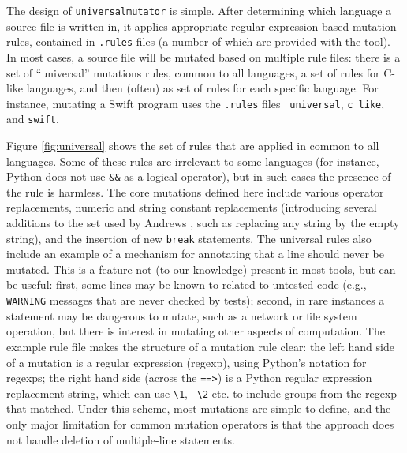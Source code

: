 The design of {\tt universalmutator} is simple.  After determining
which language a source file is written in, it applies appropriate
regular expression based mutation rules, contained in {\tt .rules}
files (a number of which are provided with the tool).  In most cases, a source file will be mutated based on multiple
rule files:  there is a set of ``universal'' mutations rules, common
to all languages, a set of rules for C-like languages, and then
(often) as set of rules for each specific language.  For instance,
mutating a Swift program uses the {\tt .rules} files {\tt
  universal}, {\tt c\_like}, and {\tt swift}.  

Figure \ref{fig:universal} shows the set of rules that are applied in
common to all languages.  Some of these rules are irrelevant to some
languages (for instance, Python does not use {\tt \&\&} as a logical
operator), but in such cases the presence of the rule is harmless.  The
core mutations defined here include various operator replacements,
numeric and string constant replacements (introducing several
additions to the set used by Andrews \cite{mutant}, such as replacing
any string by the empty string), and the insertion of new {\tt break}
statements.  The universal rules also include an example of a
mechanism for annotating that a line should never be mutated.  This is
a feature not (to our knowledge) present in most tools, but can be
useful:  first, some lines may be known to related to untested code
(e.g., {\tt WARNING} messages that are never checked by tests);
second, in rare instances a statement may be dangerous to mutate, such
as a network or file system operation, but there is interest in
mutating other aspects of computation.  The example rule file makes
the structure of a mutation rule clear:  the left hand side of a
mutation is a regular expression (regexp), using Python's notation for regexps;
the right hand side (across the {\tt ==>}) is a Python regular
expression replacement string, which can use {\tt \textbackslash 1}, {\tt
  \textbackslash 2}
etc. to include groups from the regexp that matched.  Under this
scheme, most mutations are simple to define, and the only major
limitation for common mutation operators is that the approach does not
handle deletion of multiple-line statements.


